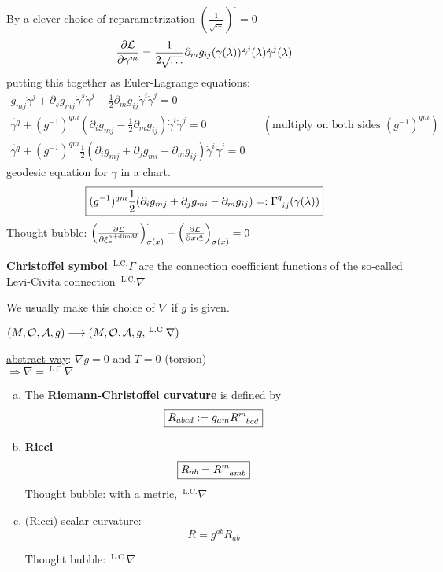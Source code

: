By a clever choice of reparametrization $(\frac{1}{\sqrt{\dots}})^{\cdot} = 0$
\[
\cibasis[\mathcal{L}]{\gamma^m} = \frac{1}{2\sqrt{\dots}} \partial_m g_{ij}(\gamma(\lambda)) \dot{\gamma}^i(\lambda) \dot{\gamma}^j(\lambda)
\]
putting this together as Euler-Lagrange equations:
\begin{align*}
g_{mj} \ddot{\gamma}^j + \partial_s g_{mj} \dot{\gamma}^s \dot{\gamma}^j - \frac{1}{2} \partial_m g_{ij} \dot{\gamma}^i \dot{\gamma}^j = 0 \\
\ddot{\gamma^q} + (g^{-1})^{qm}(\partial_i g_{mj} - \frac{1}{2} \partial_m g_{ij}) \dot{\gamma}^i \dot{\gamma}^j = 0 && (\text{multiply on both sides }(g^{-1})^{qm}) \\
\boxed{\ddot{\gamma^q} + (g^{-1})^{qm}\frac{1}{2} (\partial_i g_{mj} + \partial_j g_{mi} - \partial_m g_{ij}) \dot{\gamma}^i \dot{\gamma}^j = 0}
\end{align*}
geodesic equation for $\gamma$ in a chart.  
\[
\boxed{(g^{-1})^{qm}\frac{1}{2} (\partial_i g_{mj} + \partial_j g_{mi} - \partial_m g_{ij} ) =: \ccf{q}{ij}(\gamma(\lambda))
}
\]
Thought bubble: $\left(\cibasis[\mathcal{L}]{\xi_x^{a+\text{dim}M}} \right)^{\cdot}_{\sigma(x)} - \left(\cibasis[\mathcal{L}]{xi^a_x} \right)_{\sigma(x)} = 0$

\begin{definition}
\textbf{Christoffel symbol} ${\,}^{\text{L.C.}}\Gamma$ are the connection coefficient functions of the so-called Levi-Civita connection ${\,}^{\text{L.C.}}\nabla$
\end{definition}
We usually make this choice of $\nabla$ if $g$ is given.  

$(M, \mathcal{O}, \A, g) \to (M, \mathcal{O}, \A, g, {\,}^{\text{L.C.}}\nabla)$

\underline{abstract way}: $\nabla g = 0$ and $T = 0$ (torsion) \\
$\Longrightarrow \nabla = {\,}^{\text{L.C.}}\nabla$

\begin{definition}
\begin{enumerate}[(a)]
\item The \textbf{Riemann-Christoffel curvature} is defined by 
\begin{equation}
\boxed{R_{abcd} := g_{am}R\indices{^m_{bcd}}}
\end{equation}

\item \textbf{Ricci}
\begin{equation}
\boxed{R_{ab} = R\indices{^m_{amb}}}
\end{equation}
Thought bubble: with a metric, ${\,}^{\text{L.C.}}\nabla$

\item (Ricci) scalar curvature:
\begin{equation}
\boxed{R = g^{ab} R_{ab}}
\end{equation}

Thought bubble: ${\,}^{\text{L.C.}}\nabla$
\end{enumerate}
\end{definition}

